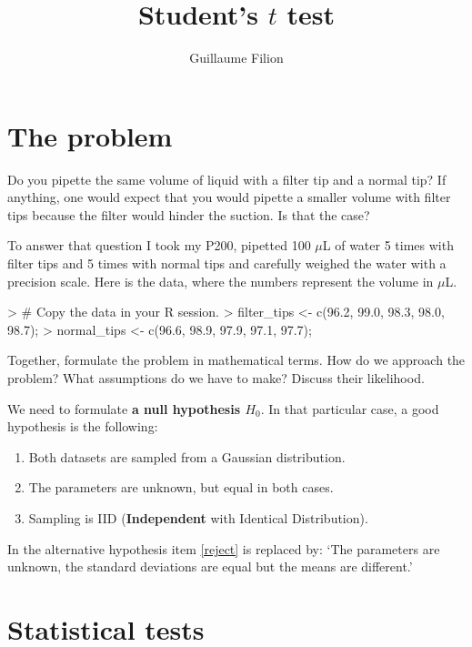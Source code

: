 \documentclass[a4paper]{article}
\title{Student's $t$ test}
\author{Guillaume Filion}
\theoremstyle{definition}
\begin{document}
\maketitle


\section{The problem}

Do you pipette the same volume of liquid with a filter tip and a
normal tip? If anything, one would expect that you would pipette
a smaller volume with filter tips because the filter would hinder the
suction. Is that the case?

To answer that question I took my P200, pipetted 100 $\mu$L
of water 5 times with filter tips and 5 times with normal tips and
carefully weighed the water with a precision scale. Here is the data,
where the numbers represent the volume in $\mu$L.

\begin{Schunk}
\begin{Sinput}
> # Copy the data in your R session.
> filter_tips <- c(96.2, 99.0, 98.3, 98.0, 98.7);
> normal_tips <- c(96.6, 98.9, 97.9, 97.1, 97.7);
\end{Sinput}
\end{Schunk}

\begin{Exercise}
Together, formulate the problem in mathematical terms. How do we
approach the problem? What assumptions do we have to make? Discuss
their likelihood.
\end{Exercise}
\begin{Answer}
We need to formulate \textbf{a null hypothesis $H_0$}. In that
particular case, a good hypothesis is the following:
\begin{enumerate}
\item
Both datasets are sampled from a Gaussian distribution.
\item
\label{reject}
The parameters are unknown, but equal in both cases.
\item
Sampling is IID (\textbf{Independent} with Identical Distribution).
\end{enumerate}
In the alternative hypothesis item \ref{reject} is replaced by:
`The parameters are unknown, the standard deviations are equal
but the means are different.'
\end{Answer}


\section{Statistical tests}
\end{document}
